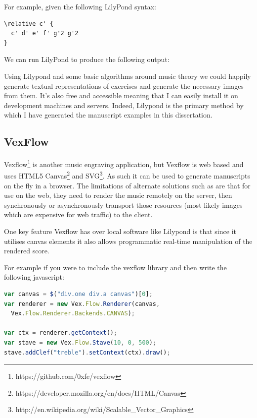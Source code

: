 For example, given the following LilyPond syntax:

\begin{lstlisting}
\relative c' {
  c' d' e' f' g'2 g'2
}
\end{lstlisting}

We can run LilyPond to produce the following output:


Using Lilypond and some basic algorithms around music theory we could happily generate textual representations of exercises and generate the necessary images from them. It's also free and accessible meaning that I can easily install it on development machines and servers. Indeed, Lilypond is the primary method by which I have generated the manuscript examples in this dissertation.

\subsection*{VexFlow}

Vexflow\footnote{https://github.com/0xfe/vexflow} is another music engraving application, but Vexflow is web based and uses HTML5 Canvas\footnote{https://developer.mozilla.org/en/docs/HTML/Canvas} and SVG\footnote{http://en.wikipedia.org/wiki/Scalable\_Vector\_Graphics}. As such it can be used to generate manuscripts on the fly in a browser. The limitations of alternate solutions such as  are that for use on the web, they need to render the music remotely on the server, then synchronously or asynchronously transport those resources (most likely images which are expensive for web traffic) to the client.

One key feature Vexflow has over local software like Lilypond is that since it utilises canvas elements it also allows programmatic real-time manipulation of the rendered score.

For example if you were to include the vexflow library and then write the following javascript:

\begin{lstlisting}[language=JavaScript]
var canvas = $("div.one div.a canvas")[0];
var renderer = new Vex.Flow.Renderer(canvas,
  Vex.Flow.Renderer.Backends.CANVAS);

var ctx = renderer.getContext();
var stave = new Vex.Flow.Stave(10, 0, 500);
stave.addClef("treble").setContext(ctx).draw();
\end{lstlisting}


